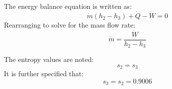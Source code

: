 The energy balance equation is written as:  
\[
\dot{m} \left( h_2 - h_3 \right) + \dot{Q} - \dot{W} = 0
\]  
Rearranging to solve for the mass flow rate:  
\[
\dot{m} = \frac{\dot{W}}{h_2 - h_3}
\]  

The entropy values are noted:  
\[
s_2 = s_3
\]  
It is further specified that:  
\[
s_3 = s_2 = 0.9006
\]